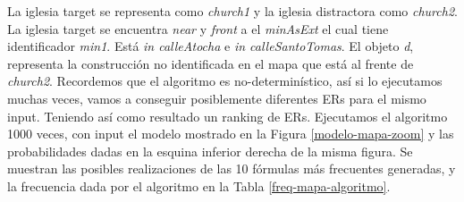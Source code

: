 La iglesia target se representa como {\it church1} y la iglesia distractora como {\it church2}. La iglesia target se encuentra {\it near} y {\it front} a el {\it minAsExt} el cual tiene identificador {\it min1}. Est\'a {\it in calleAtocha} e {\it in calleSantoTomas}. El objeto {\it d}, representa la construcci\'on no identificada en el mapa que est\'a al frente de {\it church2}.
Recordemos que el algoritmo es no-determin\'istico, as\'i si lo ejecutamos muchas veces, vamos a conseguir posiblemente diferentes ERs para el mismo input. Teniendo as\'i como resultado un ranking de ERs.
Ejecutamos el algoritmo 1000 veces, con input el modelo mostrado en la Figura \ref{modelo-mapa-zoom} y las probabilidades dadas en la esquina inferior derecha de la misma figura. Se muestran las posibles realizaciones de las 10 f\'ormulas m\'as frecuentes generadas, y la frecuencia dada por el algoritmo en la Tabla \ref{freq-mapa-algoritmo}. 




